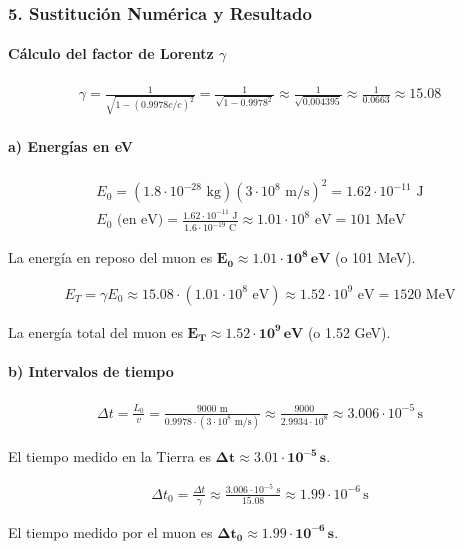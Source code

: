 \subsubsection*{5. Sustitución Numérica y Resultado}
\paragraph*{Cálculo del factor de Lorentz $\gamma$}
\begin{gather}
    \gamma = \frac{1}{\sqrt{1 - (0.9978c/c)^2}} = \frac{1}{\sqrt{1 - 0.9978^2}} \approx \frac{1}{\sqrt{0.004395}} \approx \frac{1}{0.0663} \approx 15.08
\end{gather}

\paragraph*{a) Energías en eV}
\begin{gather}
    E_0 = (1.8 \cdot 10^{-28} \text{ kg})(3 \cdot 10^8 \text{ m/s})^2 = 1.62 \cdot 10^{-11} \text{ J} \\
    E_0 \text{ (en eV)} = \frac{1.62 \cdot 10^{-11} \text{ J}}{1.6 \cdot 10^{-19} \text{ C}} \approx 1.01 \cdot 10^8 \text{ eV} = 101 \text{ MeV}
\end{gather}
\begin{cajaresultado}
    La energía en reposo del muon es $\boldsymbol{E_0 \approx 1.01 \cdot 10^8 \, \textbf{eV}}$ (o 101 MeV).
\end{cajaresultado}
\begin{gather}
    E_T = \gamma E_0 \approx 15.08 \cdot (1.01 \cdot 10^8 \text{ eV}) \approx 1.52 \cdot 10^9 \text{ eV} = 1520 \text{ MeV}
\end{gather}
\begin{cajaresultado}
    La energía total del muon es $\boldsymbol{E_T \approx 1.52 \cdot 10^9 \, \textbf{eV}}$ (o 1.52 GeV).
\end{cajaresultado}

\paragraph*{b) Intervalos de tiempo}
\begin{gather}
    \Delta t = \frac{L_0}{v} = \frac{9000 \text{ m}}{0.9978 \cdot (3 \cdot 10^8 \text{ m/s})} \approx \frac{9000}{2.9934 \cdot 10^8} \approx 3.006 \cdot 10^{-5} \, \text{s}
\end{gather}
\begin{cajaresultado}
    El tiempo medido en la Tierra es $\boldsymbol{\Delta t \approx 3.01 \cdot 10^{-5} \, \textbf{s}}$.
\end{cajaresultado}
\begin{gather}
    \Delta t_0 = \frac{\Delta t}{\gamma} \approx \frac{3.006 \cdot 10^{-5} \text{ s}}{15.08} \approx 1.99 \cdot 10^{-6} \, \text{s}
\end{gather}
\begin{cajaresultado}
    El tiempo medido por el muon es $\boldsymbol{\Delta t_0 \approx 1.99 \cdot 10^{-6} \, \textbf{s}}$.
\end{cajaresultado}

